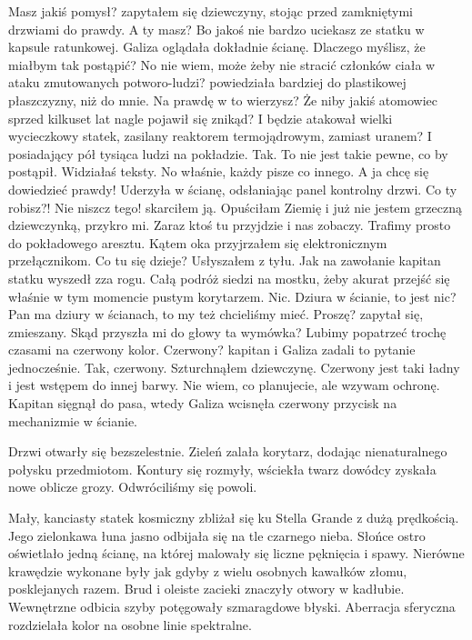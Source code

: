 \begin{dialogue}
	\ds{} Masz jakiś pomysł? \dm{} zapytałem się dziewczyny, stojąc przed zamkniętymi drzwiami do prawdy.
	\ds{} A ty masz? Bo jakoś nie bardzo uciekasz ze statku w kapsule ratunkowej. \dm{} Galiza oglądała dokładnie ścianę.
	\ds{} Dlaczego myślisz, że miałbym tak postąpić?
	\ds{} No nie wiem, może żeby nie stracić członków ciała w ataku zmutowanych potworo-ludzi? \dm{} powiedziała bardziej do plastikowej płaszczyzny, niż do mnie.
	\ds{} Na prawdę w to wierzysz? Że niby jakiś atomowiec sprzed kilkuset lat nagle pojawił się znikąd? I będzie atakował wielki wycieczkowy statek, zasilany reaktorem termojądrowym, zamiast uranem?
	\ds{} I posiadający pół tysiąca ludzi na pokładzie. Tak.
	\ds{} To nie jest takie pewne, co by postąpił. Widziałaś teksty.
	\ds{} No właśnie, każdy pisze co innego. A ja chcę się dowiedzieć prawdy! \dm{} Uderzyła w ścianę, odsłaniając panel kontrolny drzwi.
	\ds{} Co ty robisz?! Nie niszcz tego! \dm{} skarciłem ją.
	\ds{} Opuściłam Ziemię i już nie jestem grzeczną dziewczynką, przykro mi.
	\ds{} Zaraz ktoś tu przyjdzie i nas zobaczy. Trafimy prosto do pokładowego aresztu. \dm{} Kątem oka przyjrzałem się elektronicznym przełącznikom.
	\ds{} Co tu się dzieje? \dm{} Usłyszałem z tyłu. Jak na zawołanie kapitan statku wyszedł zza rogu. Całą podróż siedzi na mostku, żeby akurat przejść się właśnie w tym momencie pustym korytarzem.
	\ds{} Nic.
	\ds{} Dziura w ścianie, to jest nic?
	\ds{} Pan ma dziury w ścianach, to my też chcieliśmy mieć.
	\ds{} Proszę? \dm{} zapytał się, zmieszany. Skąd przyszła mi do głowy ta wymówka?
	\ds{} Lubimy popatrzeć trochę czasami na czerwony kolor.
	\ds{} Czerwony? \dm{} kapitan i Galiza zadali to pytanie jednocześnie.
	\ds{} Tak, czerwony. \dm{} Szturchnąłem dziewczynę. \dm{} Czerwony jest taki ładny i jest wstępem do innej barwy.
	\ds{} Nie wiem, co planujecie, ale wzywam ochronę. \dm{} Kapitan sięgnął do pasa, wtedy Galiza wcisnęła czerwony przycisk na mechanizmie w ścianie.
\end{dialogue}

Drzwi otwarły się bezszelestnie.
Zieleń zalała korytarz, dodając nienaturalnego połysku przedmiotom.
Kontury się rozmyły, wściekła twarz dowódcy zyskała nowe oblicze grozy.
Odwróciliśmy się powoli.

Mały, kanciasty statek kosmiczny zbliżał się ku Stella Grande z dużą prędkością.
Jego zielonkawa łuna jasno odbijała się na tle czarnego nieba.
Słońce ostro oświetlało jedną ścianę, na której malowały się liczne pęknięcia i spawy.
Nierówne krawędzie wykonane były jak gdyby z wielu osobnych kawałków złomu, posklejanych razem.
Brud i oleiste zacieki znaczyły otwory w kadłubie.
Wewnętrzne odbicia szyby potęgowały szmaragdowe błyski.
Aberracja sferyczna rozdzielała kolor na osobne linie spektralne.


